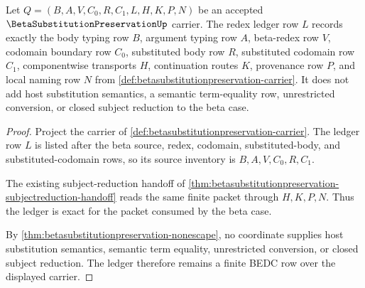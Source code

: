 \begin{theorem}
\label{thm:betasubstitutionpreservation-redex-ledger-exactness}
Let $Q=(B,A,V,C_0,R,C_1,L,H,K,P,N)$ be an accepted $\BetaSubstitutionPreservationUp$ carrier. The redex ledger row $L$ records exactly the body typing row $B$, argument typing row $A$, beta-redex row $V$, codomain boundary row $C_0$, substituted body row $R$, substituted codomain row $C_1$, componentwise transports $H$, continuation routes $K$, provenance row $P$, and local naming row $N$ from \autoref{def:betasubstitutionpreservation-carrier}. It does not add host substitution semantics, a semantic term-equality row, unrestricted conversion, or closed subject reduction to the beta case.
\end{theorem}
\begin{proof}
Project the carrier of \autoref{def:betasubstitutionpreservation-carrier}. The ledger row $L$ is listed after the beta source, redex, codomain, substituted-body, and substituted-codomain rows, so its source inventory is $B,A,V,C_0,R,C_1$.

The existing subject-reduction handoff of \autoref{thm:betasubstitutionpreservation-subjectreduction-handoff} reads the same finite packet through $H,K,P,N$. Thus the ledger is exact for the packet consumed by the beta case.

By \autoref{thm:betasubstitutionpreservation-nonescape}, no coordinate supplies host substitution semantics, semantic term equality, unrestricted conversion, or closed subject reduction. The ledger therefore remains a finite BEDC row over the displayed carrier.
\end{proof}

